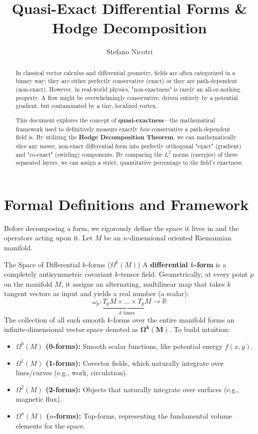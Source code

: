 \documentclass[11pt]{article}
\title{\textbf{Quasi-Exact Differential Forms \& Hodge Decomposition}}
\author{Stefano Nicotri}
\date{}
\begin{document}
\maketitle

\begin{abstract}
\noindent In classical vector calculus and differential geometry, fields are often categorized in a binary way: they are either perfectly conservative (exact) or they are path-dependent (non-exact). However, in real-world physics, "non-exactness" is rarely an all-or-nothing property. A flow might be overwhelmingly conservative, driven entirely by a potential gradient, but contaminated by a tiny, localized vortex. 

This document explores the concept of \textbf{quasi-exactness}---the mathematical framework used to definitively measure exactly \textit{how} conservative a path-dependent field is. By utilizing the \textbf{Hodge Decomposition Theorem}, we can mathematically slice any messy, non-exact differential form into perfectly orthogonal "exact" (gradient) and "co-exact" (swirling) components. By comparing the $L^2$ norms (energies) of these separated layers, we can assign a strict, quantitative percentage to the field's exactness.
\end{abstract}

\vspace{1em}

\section{Formal Definitions and Framework}
Before decomposing a form, we rigorously define the space it lives in and the operators acting upon it. Let $M$ be an $n$-dimensional oriented Riemannian manifold.

\begin{defbox}{The Space of Differential $k$-forms ($\Omega^k(M)$)}
A \textbf{differential $k$-form} is a completely antisymmetric covariant $k$-tensor field. Geometrically, at every point $p$ on the manifold $M$, it assigns an alternating, multilinear map that takes $k$ tangent vectors as input and yields a real number (a scalar):
\[ \omega_p : \underbrace{T_p M \times \dots \times T_p M}_{k \text{ times}} \to \mathbb{R} \]
The collection of all such smooth $k$-forms over the entire manifold forms an infinite-dimensional vector space denoted as $\mathbf{\Omega^k(M)}$. To build intuition:
\begin{itemize}[noitemsep]
    \item \textbf{$\Omega^0(M)$ (0-forms):} Smooth scalar functions, like potential energy $f(x,y)$.
    \item \textbf{$\Omega^1(M)$ (1-forms):} Covector fields, which naturally integrate over lines/curves (e.g., work, circulation).
    \item \textbf{$\Omega^2(M)$ (2-forms):} Objects that naturally integrate over surfaces (e.g., magnetic flux).
    \item \textbf{$\Omega^n(M)$ ($n$-forms):} Top-forms, representing the fundamental volume elements for the space.
\end{itemize}
\end{defbox}
\end{document}
